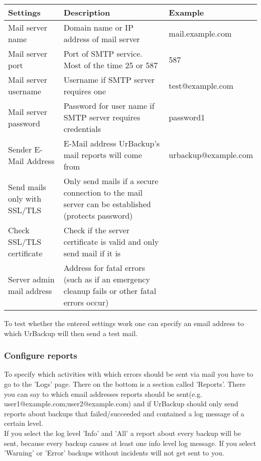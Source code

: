 \documentclass[a4paper,10pt]{article}
\begin{document}
\begin{longtable}{|p{}|p{}|p{}|}
\hline
Settings  & Description & Example\\
\hline\hline
Mail server name & Domain name or IP address of mail server & mail.example.com \\
\hline
Mail server port & Port of SMTP service. Most of the time 25 or 587 & 587 \\
\hline
Mail server username & Username if SMTP server requires one & test@example.com \\
\hline
Mail server password & Password for user name if SMTP server requires credentials & password1 \\
\hline
Sender E-Mail Address & E-Mail address UrBackup's mail reports will come from & urbackup@example.com \\
\hline
Send mails only with SSL/TLS & Only send mails if a secure connection to the mail server can be established (protects password) & \\
\hline
Check SSL/TLS certificate & Check if the server certificate is valid and only send mail if it is & \\
\hline
Server admin mail address & Address for fatal errors (such as if an emergency cleanup fails or other fatal errors occur) & \\
\hline
\end{longtable}

To test whether the entered settings work one can specify an email address to which UrBackup will then send a test mail.

\subsubsection{Configure reports}
\label{subsub:configure_reports}

To specify which activities with which errors should be sent via mail you have to go to the 'Logs' page. There on the bottom is a section called 'Reports'.
There you can say to which email addresses reports should be sent(e.g. user1@example.com;user2@example.com) and if UrBackup should only send reports about backups that
failed/succeeded and contained a log message of a certain level.\\
If you select the log level 'Info' and 'All' a report about every backup will be sent, because every backup causes at least one info level log message. If you select 'Warning' or 'Error' backups without incidents will not get sent to you.
\end{document}

